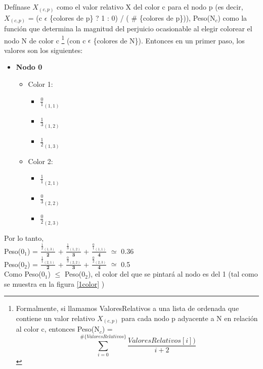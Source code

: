 Defínase  ${X}_{(c,p)}$ como el valor relativo X del color c para el nodo p (es decir, ${X}_{(c,p)}$ =  (c $\epsilon$ \{colores de p\} ? 1 : 0) / ( \# \{colores de p\})), Peso(N$_{c}$) como la función que determina la magnitud del perjuicio ocasionable al elegir colorear el nodo N de color c
\footnote{Formalmente, si llamamos ValoresRelativos a una lista de ordenada que contiene un valor relativo ${X}_{(c,p)}$ para cada nodo p adyacente a N en relación al color c, entonces Peso(N$_{c}$) = \[
\sum_{i=0}^{\# \{ ValoresRelativos \}} \frac{ValoresRelativos[i])}{i+2}
\] }
 (con c $\epsilon$ \{colores de N\}). Entonces en un primer paso, los valores son los siguientes:




\begin{itemize}
	\item \textbf{Nodo 0}
	\begin{itemize}
		\item Color 1:
		\begin{itemize}
			\item  $\frac{0}{1}_{(1,1)}$
			\item  $\frac{1}{3}_{(1,2)}$
			\item  $\frac{1}{2}_{(1,3)}$
		\end{itemize}

		\item Color 2:
		\begin{itemize}
			\item  $\frac{1}{1}_{(2,1)}$
			\item  $\frac{0}{3}_{(2,2)}$
			\item  $\frac{0}{2}_{(2,3)}$
		\end{itemize}
	\end{itemize}
\end{itemize}

Por lo tanto, \\
Peso(0$_{1}$) =  $\frac{ \frac{1}{2}_{(1,3)}}{\textbf{2}}$ + $\frac{\frac{1}{3}_{(1,2)}}{\textbf{3}}$ + $\frac{\frac{0}{1}_{(1,1)}}{\textbf{4}}$ $\simeq$ 0.36 \\
Peso(0$_{2}$) =  $\frac{\frac{1}{1}_{(2,1)}}{\textbf{2}}$ + $\frac{\frac{0}{3}_{(2,2)}}{\textbf{3}}$ + $\frac{\frac{0}{2}_{(2,3)}}{\textbf{4}}$ $\simeq$  0.5 \\
\newline
Como Peso(0$_{1}$) $\leq$  Peso(0$_{2}$), el color del que se pintará al nodo es del 1 (tal como se muestra en la \newline
figura \ref{1color} )

